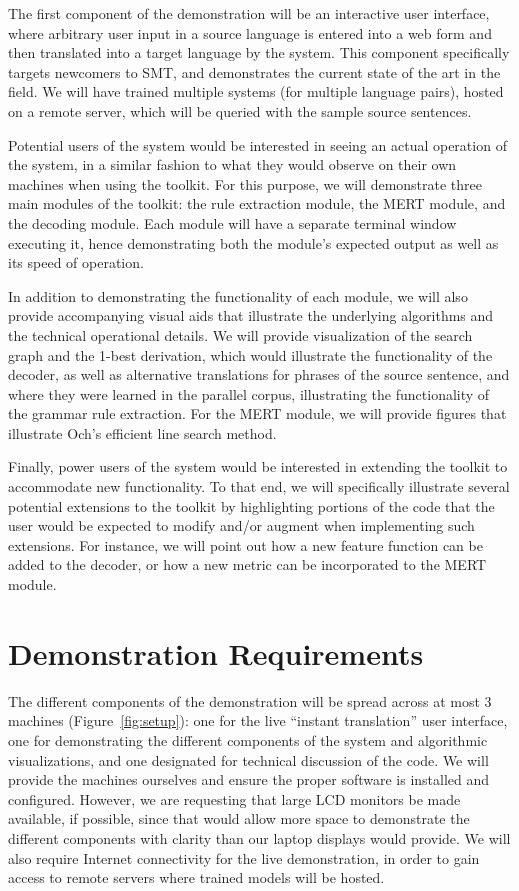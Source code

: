 \documentclass[11pt]{article}
\begin{document}
The first component of the demonstration will be an interactive user interface,
where arbitrary user input in a source language is entered into a web form and
then translated into a target language by the system.  This component
specifically targets newcomers to SMT, and demonstrates the current state of
the art in the field.  We will have trained multiple systems (for multiple
language pairs), hosted on a remote server, which will be queried with the
sample source sentences.

Potential users of the system would be interested in seeing an actual operation
of the system, in a similar fashion to what they would observe on their own
machines when using the toolkit.  For this purpose, we will demonstrate three
main modules of the toolkit: the rule extraction module, the MERT module, and
the decoding module.  Each module will have a separate terminal window
executing it, hence demonstrating both the module's expected output as well as
its speed of operation.

In addition to demonstrating the functionality of each module, we will also
provide accompanying visual aids that illustrate the underlying algorithms and
the technical operational details.  We will provide visualization of the search
graph and the 1-best derivation, which would illustrate the functionality of
the decoder, as well as alternative translations for phrases of the source
sentence, and where they were learned in the parallel corpus, illustrating the
functionality of the grammar rule extraction.  For the MERT module, we will
provide figures that illustrate Och's efficient line search method.

Finally, power users of the system would be interested in extending the toolkit
to accommodate new functionality.  To that end, we will specifically illustrate
several potential extensions to the toolkit by highlighting portions of the
code that the user would be expected to modify and/or augment when implementing
such extensions.  For instance, we will point out how a new feature function
can be added to the decoder, or how a new metric can be incorporated to the
MERT module.

\section{Demonstration Requirements}

The different components of the demonstration will be spread across at most 3
machines (Figure~\ref{fig:setup}): one for the live ``instant translation'' user interface, one for
demonstrating the different components of the system and algorithmic
visualizations, and one designated for technical discussion of the code.  We
will provide the machines ourselves and ensure the proper software is installed
and configured.  However, we are requesting that large LCD monitors be made
available, if possible, since that would allow more space to demonstrate the
different components with clarity than our laptop displays would provide.  We
will also require Internet connectivity for the live demonstration, in order to
gain access to remote servers where trained models will be hosted.
\end{document}
